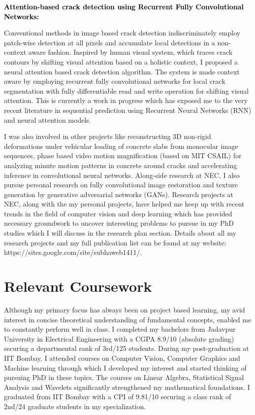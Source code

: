 \documentclass{article}
\newcommand{\statement}[1]{\par\medskip
	{\textcolor{black}{\textbf{#1:}}}\space
}
\begin{document}
	\statement{Attention-based crack detection using Recurrent Fully Convolutional Networks}
	Conventional methods in image based crack detection indiscriminately employ patch-wise detection at all pixels and accumulate local detections in a non-context aware fashion. Inspired by human visual system, which traces crack contours by shifting visual attention based on a holistic context, I proposed a neural attention based crack detection algorithm. The system is made context aware by employing recurrent fully convolutional networks for local crack segmentation with fully differentiable read and write operation for shifting visual attention. This is currently a work in progress which has exposed me to the very recent literature in sequential prediction using Recurrent Neural Networks (RNN) and neural attention models.
	
	\vspace{0.1cm}
	I was also involved in other projects like reconstructing 3D non-rigid deformations under vehicular loading of concrete slabs from monocular image sequences, phase based video motion magnification (based on MIT CSAIL) for analyzing minute motion patterns in concrete around cracks and accelerating inference in convolutional neural networks. Along-side research at NEC, I also pursue personal research on fully convolutional image restoration and texture generation by generative adversarial networks (GANs). Research projects at NEC, along with the my personal projects, have helped me keep up with recent trends in the field of computer vision and deep learning which has provided necessary groundwork to uncover interesting problems to pursue in my PhD studies which I will discuss in the research plan section. Details about all my research projects and my full publication list can be found at my website: https://sites.google.com/site/subhaweb1411/.

	\vspace*{-0.25cm}
	\section{Relevant Coursework}
	\vspace*{-0.25cm}
	Although my primary focus has always been on project based learning, my avid interest in concise theoretical understanding of fundamental concepts, enabled me to constantly perform well in class. I completed my bachelors from Jadavpur University in Electrical Engineering with a CGPA 8.9/10 (absolute grading) securing a departmental rank of 3rd/125 students. During my post-graduation at IIT Bombay, I attended courses on Computer Vision, Computer Graphics and Machine learning through which I developed my interest and started thinking of pursuing PhD in these topics. The courses on Linear Algebra, Statistical Signal Analysis and Wavelets significantly strengthened my mathematical foundations. I graduated from IIT Bombay with a CPI of 9.81/10 securing a class rank of 2nd/24 graduate students in my specialization.
	
\end{document}
